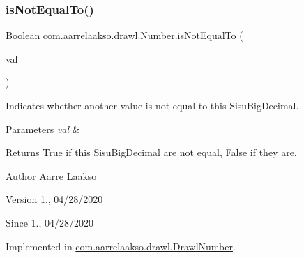 \mbox{\label{interfacecom_1_1aarrelaakso_1_1drawl_1_1_number_a4684335f60995aca55e4b972fbb3b8ca}} 
\subsubsection{\texorpdfstring{is\+Not\+Equal\+To()}{isNotEqualTo()}}
{\footnotesize\ttfamily Boolean com.\+aarrelaakso.\+drawl.\+Number.\+is\+Not\+Equal\+To (\begin{DoxyParamCaption}\item[{@Not\+Null final \hyperlink{interfacecom_1_1aarrelaakso_1_1drawl_1_1_number}{Number}}]{val }\end{DoxyParamCaption})}



Indicates whether another value is not equal to this Sisu\+Big\+Decimal. 


\begin{DoxyParams}{Parameters}
{\em val} & \\
\hline
\end{DoxyParams}
\begin{DoxyReturn}{Returns}
True if this Sisu\+Big\+Decimal are not equal, False if they are. 
\end{DoxyReturn}
\begin{DoxyAuthor}{Author}
Aarre Laakso 
\end{DoxyAuthor}
\begin{DoxyVersion}{Version}
1., 04/28/2020 
\end{DoxyVersion}
\begin{DoxySince}{Since}
1., 04/28/2020 
\end{DoxySince}


Implemented in \hyperlink{classcom_1_1aarrelaakso_1_1drawl_1_1_drawl_number_a9d60605e816e0cb6430545fa3ea28b19}{com.\+aarrelaakso.\+drawl.\+Drawl\+Number}.

\mbox{\label{interfacecom_1_1aarrelaakso_1_1drawl_1_1_number_a4748fed26ef4d662d7a277dc2687acca}} 
